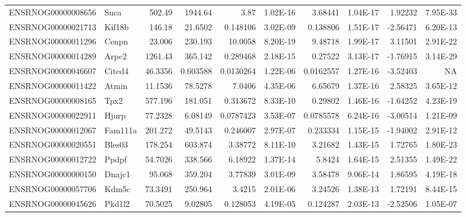 \begin{sidewaystable}[]
\begin{tabular}{llrrrrrrrr}
ENSRNOG00000008656 & Snca     & 502.49       & 1944.64      & 3.87       & 1.02E-16   & 3.68441      & 1.04E-17   & 1.92232     & 7.95E-33     \\
ENSRNOG00000021713 & Kif18b   & 146.18       & 21.6502      & 0.148106   & 3.02E-09   & 0.138806     & 1.51E-17   & -2.56471    & 6.20E-13     \\
ENSRNOG00000011296 & Cenpn    & 23.006       & 230.193      & 10.0058    & 8.20E-19   & 9.48718      & 1.99E-17   & 3.11501     & 2.91E-22     \\
ENSRNOG00000014289 & Arpc2    & 1261.43      & 365.142      & 0.289468   & 2.18E-15   & 0.27522      & 3.13E-17   & -1.76915    & 3.14E-29     \\
ENSRNOG00000046607 & Cited4   & 46.3356      & 0.603588     & 0.0130264  & 1.22E-06   & 0.0162557    & 1.27E-16   & -3.52403    & NA           \\
ENSRNOG00000011422 & Atmin    & 11.1536      & 78.5278      & 7.0406     & 4.35E-06   & 6.65679      & 1.37E-16   & 2.58325     & 3.65E-12     \\
ENSRNOG00000008165 & Tpx2     & 577.196      & 181.051      & 0.313672   & 8.33E-10   & 0.29802      & 1.46E-16   & -1.64252    & 4.23E-19     \\
ENSRNOG00000022911 & Hjurp    & 77.2328      & 6.08149      & 0.0787423  & 3.53E-07   & 0.0785578    & 6.24E-16   & -3.00514    & 1.21E-09     \\
ENSRNOG00000012067 & Fam111a  & 201.272      & 49.5143      & 0.246007   & 2.97E-07   & 0.233334     & 1.15E-15   & -1.94002    & 2.91E-12     \\
ENSRNOG00000020551 & Bles03   & 178.254      & 603.874      & 3.38772    & 8.11E-10   & 3.21682      & 1.43E-15   & 1.72765     & 1.80E-23     \\
ENSRNOG00000012722 & Ppdpf    & 54.7026      & 338.566      & 6.18922    & 1.37E-14   & 5.8424       & 1.64E-15   & 2.51355     & 1.49E-22     \\
ENSRNOG00000000150 & Dnajc1   & 95.068       & 359.204      & 3.77839    & 3.01E-09   & 3.58478      & 9.06E-14   & 1.86595     & 4.19E-18     \\
ENSRNOG00000057706 & Kdm5c    & 73.3491      & 250.964      & 3.4215     & 2.01E-06   & 3.24526      & 1.38E-13   & 1.72191     & 8.44E-15     \\
ENSRNOG00000045626 & Pkd1l2   & 70.5025      & 9.02805      & 0.128053   & 4.19E-05   & 0.124287     & 2.03E-13   & -2.52506    & 1.05E-07     \\

\end{tabular}
\end{sidewaystable}

